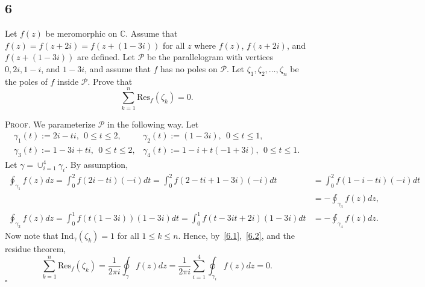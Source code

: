\documentclass[12pt]{article}
\newcounter{ProofCounter}
\newenvironment{Proof}{\stepcounter{ProofCounter}\textsc{Proof.}}{\hfill$\square$}
\begin{document}
\subsection*{6}
\begin{tcolorbox}
  Let $f(z)$ be meromorphic on $\mathbb{C}$. Assume that $f(z) = f(z + 2i) = f(z + (1-3i))$ for all $z$ where $f(z)$, $f(z + 2i)$, and $f(z + (1-3i))$
are defined. Let $\mathcal{P}$ be the parallelogram with vertices $0, 2i, 1- i$, and $1 - 3i$, and assume that $f$ has no poles on $\mathcal{P}$. Let
$\zeta_{1}, \zeta_{2}, \hdots, \zeta_{n}$ be the poles of $f$ inside $\mathcal{P}$. Prove that
\[ \sum_{k=1}^{n}\text{Res}_{f}(\zeta_{k}) = 0. \]
\end{tcolorbox}
\begin{Proof}
We parameterize $\mathcal{P}$ in the following way. Let
\[
\begin{array}{ll}
\gamma_{1}(t) := 2i - ti, \ \  0 \leq t \leq 2, & \gamma_{2}(t) := (1-3i), \ \ 0 \leq t \leq 1, \\
\gamma_{3}(t) := 1 - 3i + ti, \ \ 0 \leq t \leq 2, & \gamma_{4}(t) := 1 - i + t(-1 + 3i), \ \ 0 \leq t \leq 1.
\end{array}
\]
Let $\gamma = \cup_{i=1}^{4}\gamma_{i}$. By assumption,
\begin{align}
\oint_{\gamma_{1}}f(z)dz = \int_{0}^{2}f(2i - ti)(-i)dt = \int_{0}^{2}f(2 - ti + 1 - 3i)(-i)dt & = \int_{0}^{2}f(1 - i -ti)(-i)dt \nonumber \\
& = -\oint_{\gamma_{3}}f(z)dz, \label{6.1} \\
\oint_{\gamma_{2}}f(z)dz = \int_{0}^{1}f(t(1-3i))(1-3i)dt = \int_{0}^{1}f(t - 3it + 2i)(1 - 3i)dt & = -\oint_{\gamma_{4}}f(z)dz. \label{6.2}
\end{align}
Now note that $\text{Ind}_{\gamma}(\zeta_{k}) = 1$ for all $1 \leq k \leq n$. Hence,
by~\eqref{6.1},~\eqref{6.2}, and the residue theorem,
\[ \sum_{k=1}^{n}\text{Res}_{f}(\zeta_{k})  = \frac{1}{2\pi i}\oint_{\gamma}f(z)dz = \frac{1}{2\pi i}\sum_{i=1}^{4}\oint_{\gamma_{i}}f(z)dz = 0. \]
\end{Proof}

\newpage
\end{document}
